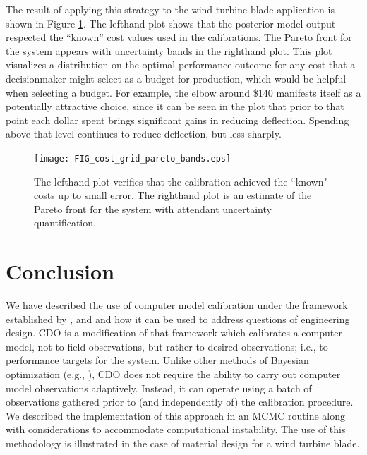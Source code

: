 \documentclass[12pt]{article}
\begin{document}
%
The result of applying this strategy to the wind turbine blade application is shown in Figure \ref{fig:known_cost}. 
%
The lefthand plot shows that the posterior model output respected the ``known'' cost values used in the calibrations.
%
The Pareto front for the system appears with uncertainty bands in the righthand plot.
%
This plot visualizes a distribution on the optimal performance outcome for any cost that a decisionmaker might select as a budget for production, which would be helpful when selecting a budget.
%
For example, the elbow around \$140 manifests itself as a potentially attractive choice, since it can be seen in the plot that prior to that point each dollar spent brings significant gains in reducing deflection.
%
Spending above that level continues to reduce deflection, but less sharply.


\begin{figure}
\centering
\texttt{[image: FIG\_cost\_grid\_pareto\_bands.eps]}
\caption{The lefthand plot verifies that the calibration achieved the ``known" costs up to small error. The righthand plot is an estimate of the Pareto front for the system with attendant uncertainty quantification.}
\label{fig:known_cost}
\end{figure}




\section{Conclusion} \label{conclusion}

We have described the 
use of computer model calibration under the framework established by \cite{Kennedy2001}, \cite{Williams2006} and \cite{Bayarri2007} and how it can be used to address questions of engineering design. 
%
CDO is a modification of that framework which calibrates a computer model, not to field observations, but rather to desired observations; i.e., to performance targets for the system. 
%
Unlike other methods of Bayesian optimization (e.g., \citealt{Shahriari2016}), CDO does not require the ability to carry out computer model observations adaptively.
%
Instead, it can operate using a batch of observations gathered prior to (and independently of) the calibration procedure.
%
We described the implementation of this approach in an MCMC routine along with considerations to accommodate computational instability.
%
The use of this methodology is illustrated in the case of material design for a wind turbine blade. 
\end{document}
